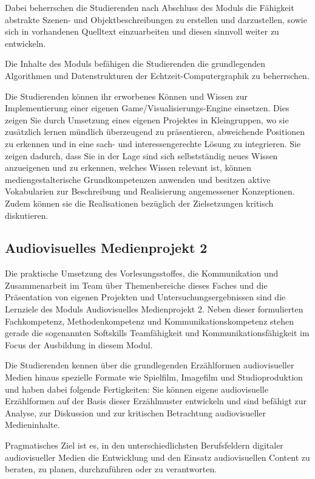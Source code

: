 Dabei beherrschen die Studierenden nach Abschluss des Moduls die
Fähigkeit abstrakte Szenen- und Objektbeschreibungen zu erstellen und
darzustellen, sowie sich in vorhandenen Quelltext einzuarbeiten und
diesen sinnvoll weiter zu entwickeln.

Die Inhalte des Moduls befähigen die Studierenden die grundlegenden
Algorithmen und Datenstrukturen der Echtzeit-Computergraphik zu
beherrschen.

Die Studierenden können ihr erworbenes Können und Wissen zur
Implementierung einer eigenen Game/Visualisierungs-Engine einsetzen.
Dies zeigen Sie durch Umsetzung eines eigenen Projektes in Kleingruppen,
wo sie zusätzlich lernen mündlich überzeugend zu präsentieren,
abweichende Positionen zu erkennen und in eine sach- und
interessengerechte Lösung zu integrieren. Sie zeigen dadurch, dass Sie
in der Lage sind sich selbstständig neues Wissen anzueigenen und zu
erkennen, welches Wissen relevant ist, können mediengestalterische
Grundkompetenzen anwenden und besitzen aktive Vokabularien zur
Beschreibung und Realisierung angemessener Konzeptionen. Zudem können
sie die Realisationen bezüglich der Zielsetzungen kritisch diskutieren.

\subsection*{Audiovisuelles Medienprojekt
2}\label{audiovisuelles-medienprojekt-2}

Die praktische Umsetzung des Vorlesungsstoffes, die Kommunikation und
Zusammenarbeit im Team über Themenbereiche dieses Faches und die
Präsentation von eigenen Projekten und Untersuchungsergebnissen sind die
Lernziele des Moduls Audiovisuelles Medienprojekt 2. Neben dieser
formulierten Fachkompetenz, Methodenkompetenz und
Kommunikationskompetenz stehen gerade die sogenannten Softskills
Teamfähigkeit und Kommunikationsfähigkeit im Focus der Ausbildung in
diesem Modul.

Die Studierenden kennen über die grundlegenden Erzählformen
audiovisueller Medien hinaus spezielle Formate wie Spielfilm, Imagefilm
und Studioproduktion und haben dabei folgende Fertigkeiten: Sie können
eigene audiovisuelle Erzählformen auf der Basis dieser Erzählmuster
entwickeln und sind befähigt zur Analyse, zur Diskussion und zur
kritischen Betrachtung audiovisueller Medieninhalte.

Pragmatisches Ziel ist es, in den unterschiedlichsten Berufsfeldern
digitaler audiovisueller Medien die Entwicklung und den Einsatz
audiovisuellen Content zu beraten, zu planen, durchzuführen oder zu
verantworten.

